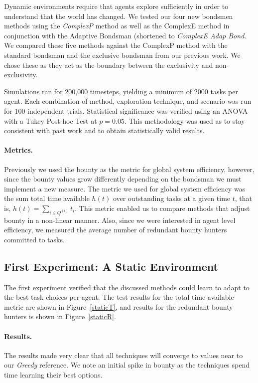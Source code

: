 \documentclass[letterpaper]{aamas2015}
\newcommand\paragrapha[1]{\paragraph*{{#1}.}}
\begin{document}
Dynamic environments require that agents explore sufficiently in order to understand that the world has changed.  We tested our four new bondsmen methods using the \textit{ComplexP} method as well as the ComplexE method in conjunction with the Adaptive Bondsman (shortened to \textit{ComplexE Adap Bond.}  We compared these five methods against the ComplexP method with the standard bondsman and the exclusive bondsman from our previous work.  We chose these as they act as the boundary between the exclusivity and non-exclusivity.  

Simulations ran for 200,000 timesteps, yielding a minimum of 2000 tasks per agent. Each combination of method, exploration technique, and scenario was run for 100 independent trials.  Statistical significance was verified using an ANOVA with a Tukey Post-hoc Test at \(p=0.05\).  This methodology was used as to stay consistent with past work and to obtain statistically valid results.  

\paragrapha{Metrics}
Previously we used the bounty as the metric for global system efficiency, however, since the bounty values grow differently depending on the bondsman we must implement a new measure.  The metric we used for global system efficiency was the sum total time available \(h(t)\) over outstanding tasks at a given time \(t\), that is, \(h(t) =\sum_{i\in Q^{(t)}}t_i\).  This metric enabled us to compare methods that adjust bounty in a non-linear manner.  Also, since we were interested in agent level efficiency, we measured the average number of redundant bounty hunters committed to tasks.




\subsection{First Experiment: A Static Environment}

The first experiment verified that the discussed methods could learn to adapt to the best task choices per-agent.  
The test results for the total time available metric are shown in Figure~\ref{staticT}, and results for the redundant bounty hunters is shown in Figure~\ref{staticR}.



\paragrapha{Results}

The results made very clear that all techniques will converge to values near to our {\it Greedy} reference.  We note an initial spike in bounty as the techniques spend time learning their best options.
\end{document}

